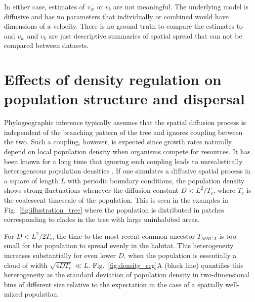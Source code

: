 \documentclass[aps,rmp, twocolumn]{revtex4}
\begin{document}
In either case, estimates of $v_w$ or $v_b$ are not meaningful.
The underlying model is diffusive and has no parameters that individually or combined would have dimensions of a velocity.
There is no ground truth to compare the estimates to and $v_w$ and $v_b$ are just descriptive summaries of spatial spread that can not be compared between datasets.


\section*{Effects of density regulation on population structure and dispersal}
Phylogeographic inference typically assumes that the spatial diffusion process is independent of the branching pattern of the tree and ignores coupling between the two.
Such a coupling, however, is expected since growth rates naturally depend on local population density when organisms compete for resources.
It has been known for a long time that ignoring such coupling leads to unrealistically heterogeneous population densities \citep{felsenstein_pain_1975}.
If one simulates a diffusive spatial process in a square of length $L$ with periodic boundary conditions, the population density shows strong fluctuations whenever the diffusion constant $D<L^2/T_c$, where $T_c$ is the coalescent timescale of the population.
This is seen in the examples in Fig.~\ref{fig:illustration_tree} where the population is distributed in patches corresponding to clades in the tree with large uninhabited areas.

For $D<L^2/2T_c$, the time to the most recent common ancestor $T_{MRCA}$ is too small for the population to spread evenly in the habitat.
This heterogeneity increases substantially for even lower $D$, when the population is essentially a cloud of width $\sqrt{4DT_c}\ll L$.
Fig.~\ref{fig:density_reg}A (black line) quantifies this heterogeneity as the standard deviation of population density in two-dimensional bins of different size relative to the expectation in the case of a spatially well-mixed population.
\end{document}
